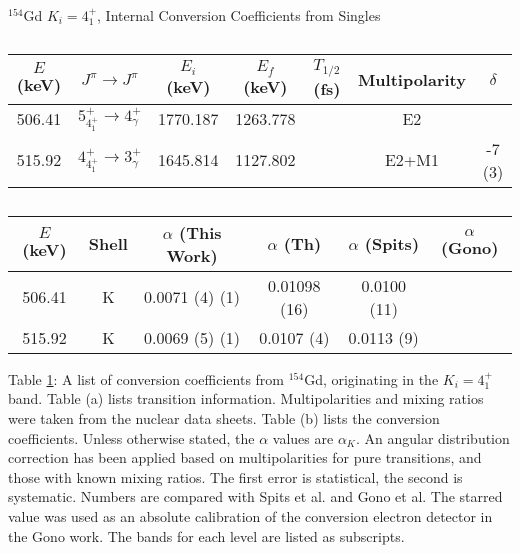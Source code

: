 \begin{table}
    \centering
    \caption{$^{154}$Gd $K_i=4^+_1$, Internal Conversion Coefficients from Singles}
    \label{tab:154Gd_Single_41_Disc}
\begin{ThreePartTable}
    \begin{subtable}{\textwidth}
        \caption{}
    \begin{tabular}{c|c|c|c|c|c|c}
        \toprule
        $E$ (keV)	&	$J^{\pi}	\rightarrow	J^{\pi}$	&	$E_i$ (keV)	&	$E_f$ (keV)	&	$T_{1/2}$ (fs)	&	Multipolarity	&	$\delta$\\
        \hline
        506.41	&	$5^+_{4^+_1}	\rightarrow	4^+_{\gamma}$	&	1770.187	&	1263.778	&		&	E2	&		\\
        \hline
        515.92	&	$4^+_{4^+_1}	\rightarrow	3^+_{\gamma}$	&	1645.814	&	1127.802	&		&	E2+M1	&	-7 (3)	\\
        \bottomrule
    \end{tabular}
    \end{subtable}
    \end{ThreePartTable}
\end{table}
\begin{table}
    \ContinuedFloat
    \begin{subtable}{\textwidth}
    \end{subtable}
    \begin{ThreePartTable}
    \begin{subtable}{\textwidth}
        \caption{}
        \begin{tabular}{c|c|c|c|c|c}
            \toprule
            $E$ (keV) & Shell &	$\alpha$ (This Work)	&	$\alpha$  (Th)\citep{kibedi08:_BRICC}	&	$\alpha$ (Spits)\citep{spits96:_154gd} & $\alpha$ (Gono)\citep{gono74:_154gd_e0}		\\
            \hline
            506.41	& K &	0.0071	(4) (1)	&	0.01098 (16)	&	0.0100 (11)	\\
            \hline
            515.92	& K & 	0.0069	(5) (1)	&	0.0107 (4)	&	0.0113 (9)	\\
            \bottomrule
        \end{tabular}
        \end{subtable}
        \begin{tablenotes}[para]
            Table \ref{tab:154Gd_Single_41_Disc}: A list of conversion coefficients from $^{154}$Gd, originating in the $K_i=4^+_1$ band. Table (a) lists transition information. Multipolarities and mixing ratios were taken from the nuclear data sheets\citep{reich09:_nds_154}. Table (b) lists the conversion coefficients. Unless otherwise stated, the $\alpha$ values are $\alpha_K$. An angular distribution correction has been applied based on multipolarities for pure transitions, and those with known mixing ratios. The first error is statistical, the second is systematic. Numbers are compared with Spits et al.\citep{spits96:_154gd} and Gono et al.\citep{gono74:_154gd_e0} The starred value was used as an absolute calibration of the conversion electron detector in the Gono work. The bands for each level are listed as subscripts.
        \end{tablenotes}
\end{ThreePartTable}
\end{table}

